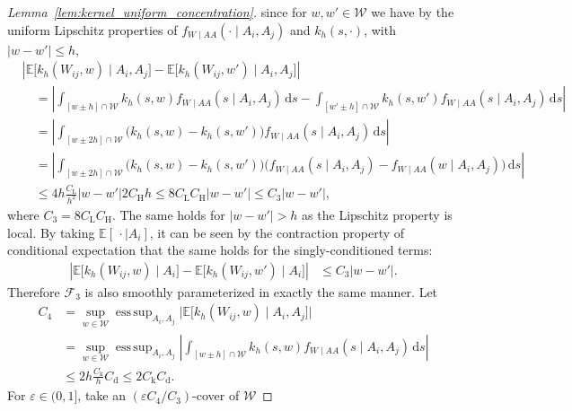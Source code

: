 \documentclass[11pt,lof]{puthesis}
\newcommand{\E}{\ensuremath{\mathbb{E}}}
\newcommand{\rH}{\ensuremath{\mathrm{H}}}
\newcommand{\rL}{\ensuremath{\mathrm{L}}}
\newcommand{\rk}{\ensuremath{\mathrm{k}}}
\newcommand{\rd}{\ensuremath{\mathrm{d}}}
\newcommand{\cF}{\ensuremath{\mathcal{F}}}
\newcommand{\cW}{\ensuremath{\mathcal{W}}}
\DeclareMathOperator*{\esssup}{ess\,sup}
\newcommand{\diff}[1]{\,\mathrm{d}#1}
\theoremstyle{break}
\theoremstyle{proof}
\newtheorem{proof}{Proof}
\begin{document}
\begin{proof}[Lemma~\ref{lem:kernel_uniform_concentration}]
  since for $w,w' \in \cW$ we have
  by the uniform Lipschitz properties of
  $f_{W \mid AA}(\cdot \mid A_i, A_j)$ and
  $k_h(s, \cdot)$,
  with $|w-w'| \leq h$,
  \begin{align*}
    &\left|
      \E\big[ k_h(W_{i j},w) \mid A_i, A_j \big]
      - \E\big[ k_h(W_{i j},w') \mid A_i, A_j \big]
    \right| \\
    &\quad=
    \left|
      \int_{[w \pm h] \cap \cW}
      k_h(s,w)
      f_{W \mid AA}(s \mid A_i, A_j)
      \diff{s}
      - \int_{[w' \pm h] \cap \cW}
      k_h(s,w')
      f_{W \mid AA}(s \mid A_i, A_j)
      \diff{s}
    \right| \\
    &\quad=
    \left|
      \int_{[w \pm 2h] \cap \cW}
      \big(
        k_h(s,w)
        - k_h(s,w')
      \big)
      f_{W \mid AA}(s \mid A_i, A_j)
      \diff{s}
    \right| \\
    &\quad=
    \left|
      \int_{[w \pm 2h] \cap \cW}
      \big(
        k_h(s,w)
        - k_h(s,w')
      \big)
      \big(
        f_{W \mid AA}(s \mid A_i, A_j)
        - f_{W \mid AA}(w \mid A_i, A_j)
      \big)
      \diff{s}
    \right| \\
    &\quad\leq
    4h
    \frac{C_\rL}{h^2}
    |w-w'|
    2 C_\rH h
    \leq
    8 C_\rL C_\rH
    |w-w'|
    \leq
    C_3
    |w-w'|,
  \end{align*}
  where $C_3 = 8 C_\rL C_\rH$.
  The same holds for $|w-w'| > h$
  as the Lipschitz property is local.
  By taking $\E[\, \cdot \mid A_i]$,
  it can be seen
  by the contraction property of conditional expectation that
  the same holds for the
  singly-conditioned terms:
  \begin{align*}
    \left|
      \E\big[ k_h(W_{i j},w) \mid A_i \big]
      - \E\big[ k_h(W_{i j},w') \mid A_i \big]
    \right|
    &\leq
    C_3
    |w-w'|.
  \end{align*}
  Therefore $\cF_3$ is also smoothly parameterized
  in exactly the same manner.
  Let
  \begin{align*}
    C_4
    &=
    \sup_{w \in \cW}
    \esssup_{A_i, A_j}
    \big|
    \E\big[ k_h(W_{i j},w) \mid A_i, A_j \big]
    \big| \\
    &=
    \sup_{w \in \cW}
    \esssup_{A_i, A_j}
    \left|
      \int_{[w \pm h] \cap \cW}
      k_h(s,w)
      f_{W \mid AA}(s \mid A_i, A_j)
      \diff{s}
    \right| \\
    &\leq 2h \frac{C_\rk}{h} C_\rd
    \leq 2 C_\rk C_\rd.
  \end{align*}
  For $\varepsilon \in (0,1]$,
  take an $(\varepsilon C_4/C_3)$-cover of $\cW$

\end{proof}
\end{document}
